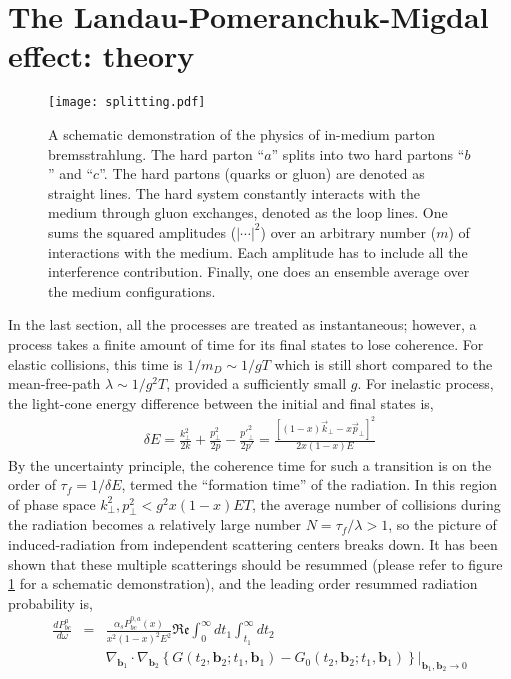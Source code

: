 \section{The Landau-Pomeranchuk-Migdal effect: theory}
\begin{figure}
\singlespacing
\centering
\texttt{[image: splitting.pdf]}
\caption[A schematic demonstration of the physics of in-medium parton]{A schematic demonstration of the physics of in-medium parton bremsstrahlung. The hard parton ``$a$'' splits into two hard partons ``$b$'' and ``$c$''. The hard partons (quarks or gluon) are denoted as straight lines. The hard system constantly interacts with the medium through gluon exchanges, denoted as the loop lines. One sums the squared amplitudes ($|\cdots|^2$) over an arbitrary number ($m$) of interactions with the medium. Each amplitude has to include all the interference contribution.
Finally, one does an ensemble average over the medium configurations.}
\label{fig:split}
\end{figure}
In the last section, all the processes are treated as instantaneous; however, a process takes a finite amount of time for its final states to lose coherence. 
For elastic collisions, this time is $1/m_D \sim 1/gT$ which is still short compared to the mean-free-path $\lambda \sim 1/g^2 T$, provided a sufficiently small $g$.
For inelastic process, the light-cone energy difference between the initial and final states is,
\begin{eqnarray}
\delta E = \frac{k_\perp^2}{2k} + \frac{p_\perp^2}{2p} - \frac{{p'}_\perp^2}{2{p'}} = \frac{ [(1-x)\vec{k}_\perp - x\vec{p}_\perp]^2}{2x(1-x)E}
\end{eqnarray}
By the uncertainty principle, the coherence time for such a transition is on the order of $\tau_f = 1/\delta E$, termed the ``formation time'' of the radiation. 
In this region of phase space $k_\perp^2, p_\perp^2 < g^2x(1-x)ET$, the average number of collisions during the radiation becomes a relatively large number $N = \tau_f/\lambda >1$, so the picture of induced-radiation from independent scattering centers breaks down.
It has been shown that these multiple scatterings should be resummed \cite{Zakharov:1996fv,Zakharov:1997uu,Baier:1996kr} (please refer to figure \ref{fig:split} for a schematic demonstration), and the leading order resummed radiation probability is,
\begin{eqnarray}
\frac{dP^{a}_{bc}}{d\omega} &=& \frac{\alpha_s P^{0,a}_{bc}(x)}{x^2(1-x)^2 E^2}\mathfrak{Re}\int_0^\infty dt_1 \int_{t_1}^{\infty} dt_2\\\nonumber &&\nabla_{\mathbf{b}_1} \cdot\nabla_{\mathbf{b}_2} \left\{G(t_2, \mathbf{b}_2; t_1, \mathbf{b}_1) - G_0(t_2, \mathbf{b}_2; t_1, \mathbf{b}_1) \right\}|_{\mathbf{b}_1, \mathbf{b}_2 \rightarrow 0}
\label{eq:theory-dR}
\end{eqnarray}
